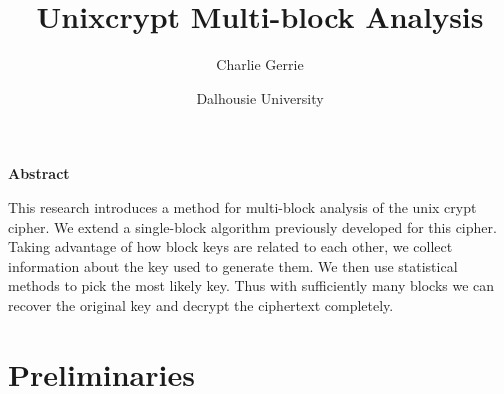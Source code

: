 \documentclass[12pt]{article}
\title{Unixcrypt Multi-block Analysis}
\date{Dalhousie University} %
\author{Charlie Gerrie}
\theoremstyle{definition}
\theoremstyle{remark}
\theoremstyle{remark}
\begin{document}
\maketitle
\newpage

\begin{center}{\textbf{Abstract}}\end{center}
This research introduces a method for multi-block analysis of the unix crypt cipher. We extend a single-block algorithm previously developed for this cipher. Taking advantage of how block keys are related to each other, we collect information about the key used to generate them. We then use statistical methods to pick the most likely key. Thus with sufficiently many blocks we can recover the original key and decrypt the ciphertext completely.

\newpage

\section{Preliminaries}
\end{document}
